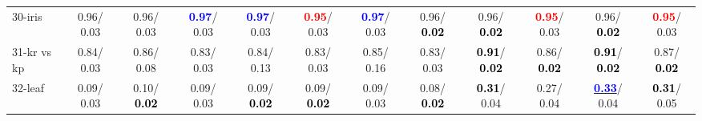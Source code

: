 \begin{table}[h]
\begin{center}
{\begin{tabular}{lc|c|c|c|c|c|c|c|c|c|c}
30-iris &   0.96/  0.03 &   0.96/  0.03 & \textcolor{blue}{\textbf{  0.97}}/  0.03 & \textcolor{blue}{\textbf{  0.97}}/  0.03 & \textcolor{red}{\textbf{  0.95}}/  0.03 & \textcolor{blue}{\textbf{  0.97}}/  0.03 &   0.96/\textcolor{black}{\textbf{  0.02}} &   0.96/\textcolor{black}{\textbf{  0.02}} & \textcolor{red}{\textbf{  0.95}}/  0.03 &   0.96/\textcolor{black}{\textbf{  0.02}} & \textcolor{red}{\textbf{  0.95}}/  0.03 \\
31-kr vs kp &   0.84/  0.03 &   0.86/  0.08 &   0.83/  0.03 &   0.84/  0.13 &   0.83/  0.03 &   0.85/  0.16 &   0.83/  0.03 & \textcolor{black}{\textbf{  0.91}}/\textcolor{black}{\textbf{  0.02}} &   0.86/\textcolor{black}{\textbf{  0.02}} & \textcolor{black}{\textbf{  0.91}}/\textcolor{black}{\textbf{  0.02}} &   0.87/\textcolor{black}{\textbf{  0.02}} \\
32-leaf &   0.09/  0.03 &   0.10/\textcolor{black}{\textbf{  0.02}} &   0.09/  0.03 &   0.09/\textcolor{black}{\textbf{  0.02}} &   0.09/\textcolor{black}{\textbf{  0.02}} &   0.09/  0.03 &   0.08/\textcolor{black}{\textbf{  0.02}} & \textcolor{black}{\textbf{  0.31}}/  0.04 &   0.27/  0.04 & \underline{\textcolor{blue}{\textbf{  0.33}}}/  0.04 & \textcolor{black}{\textbf{  0.31}}/  0.05 \\\end{tabular}}\label{stratsBalAcc0bSVM}
\end{center}
\end{table}
